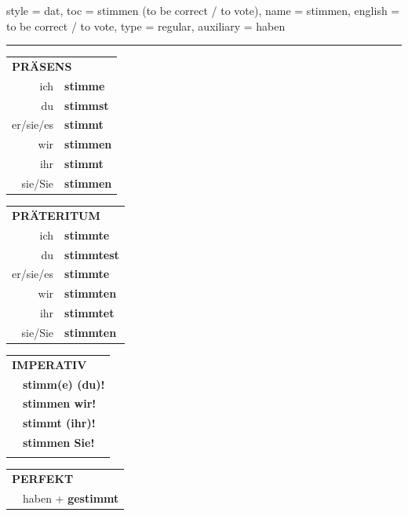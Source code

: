 \begin{verbentry}{
  style = {dat},
  toc = {stimmen (to be correct / to vote)},
  name = {stimmen},
  english = {to be correct / to vote},
  type = {regular},
  auxiliary = {haben}
}
 
    
     \vspace{5pt}

    \hrule
    
    \vspace{5pt}

  \begin{tabular}{rl}
     \multicolumn{2}{l}{\textbf{PRÄSENS} }\\
    ich & \textbf{stimme}\\
    du & \textbf{stimmst}\\
    er/sie/es & \textbf{stimmt}\\
    wir & \textbf{stimmen}\\
    ihr & \textbf{stimmt}\\
    sie/Sie & \textbf{stimmen}\\
  \end{tabular}
  \hfill
     \begin{tabular}{rl}
    \multicolumn{2}{l}{\textbf{PRÄTERITUM} }\\
    ich & \textbf{stimmte}\\
    du & \textbf{stimmtest}\\
    er/sie/es & \textbf{stimmte}\\
    wir & \textbf{stimmten}\\
    ihr & \textbf{stimmtet}\\
    sie/Sie & \textbf{stimmten}\\
  \end{tabular}
  \hfill
  \begin{tabular}{rl}
     \multicolumn{2}{l}{\textbf{IMPERATIV} }\\
   & \textbf{stimm(e) (du)!}\\
   & \textbf{stimmen wir!}\\
   & \textbf{stimmt (ihr)!}\\
   & \textbf{stimmen Sie!}\\
   & \vspace{10pt}
  \end{tabular}

    \vspace{10pt}

 \begin{tabular}{rl}
     \multicolumn{2}{l}{\textbf{PERFEKT}}\\
   & haben + \textbf{gestimmt}\\
  \end{tabular}
\hfill
   \begin{tabular}{rl}
   

\end{tabular}
\end{verbentry}
